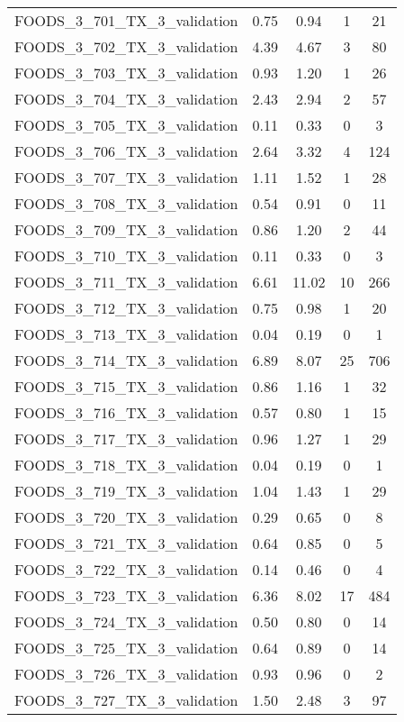 \begin{table}
\begin{tabular}{|l|c|c|c|c|}
FOODS\_3\_701\_TX\_3\_validation & 0.75 & 0.94 & 1 & 21 \\
FOODS\_3\_702\_TX\_3\_validation & 4.39 & 4.67 & 3 & 80 \\
FOODS\_3\_703\_TX\_3\_validation & 0.93 & 1.20 & 1 & 26 \\
FOODS\_3\_704\_TX\_3\_validation & 2.43 & 2.94 & 2 & 57 \\
FOODS\_3\_705\_TX\_3\_validation & 0.11 & 0.33 & 0 & 3 \\
FOODS\_3\_706\_TX\_3\_validation & 2.64 & 3.32 & 4 & 124 \\
FOODS\_3\_707\_TX\_3\_validation & 1.11 & 1.52 & 1 & 28 \\
FOODS\_3\_708\_TX\_3\_validation & 0.54 & 0.91 & 0 & 11 \\
FOODS\_3\_709\_TX\_3\_validation & 0.86 & 1.20 & 2 & 44 \\
FOODS\_3\_710\_TX\_3\_validation & 0.11 & 0.33 & 0 & 3 \\
FOODS\_3\_711\_TX\_3\_validation & 6.61 & 11.02 & 10 & 266 \\
FOODS\_3\_712\_TX\_3\_validation & 0.75 & 0.98 & 1 & 20 \\
FOODS\_3\_713\_TX\_3\_validation & 0.04 & 0.19 & 0 & 1 \\
FOODS\_3\_714\_TX\_3\_validation & 6.89 & 8.07 & 25 & 706 \\
FOODS\_3\_715\_TX\_3\_validation & 0.86 & 1.16 & 1 & 32 \\
FOODS\_3\_716\_TX\_3\_validation & 0.57 & 0.80 & 1 & 15 \\
FOODS\_3\_717\_TX\_3\_validation & 0.96 & 1.27 & 1 & 29 \\
FOODS\_3\_718\_TX\_3\_validation & 0.04 & 0.19 & 0 & 1 \\
FOODS\_3\_719\_TX\_3\_validation & 1.04 & 1.43 & 1 & 29 \\
FOODS\_3\_720\_TX\_3\_validation & 0.29 & 0.65 & 0 & 8 \\
FOODS\_3\_721\_TX\_3\_validation & 0.64 & 0.85 & 0 & 5 \\
FOODS\_3\_722\_TX\_3\_validation & 0.14 & 0.46 & 0 & 4 \\
FOODS\_3\_723\_TX\_3\_validation & 6.36 & 8.02 & 17 & 484 \\
FOODS\_3\_724\_TX\_3\_validation & 0.50 & 0.80 & 0 & 14 \\
FOODS\_3\_725\_TX\_3\_validation & 0.64 & 0.89 & 0 & 14 \\
FOODS\_3\_726\_TX\_3\_validation & 0.93 & 0.96 & 0 & 2 \\
FOODS\_3\_727\_TX\_3\_validation & 1.50 & 2.48 & 3 & 97 \\

\end{tabular}
\end{table}
